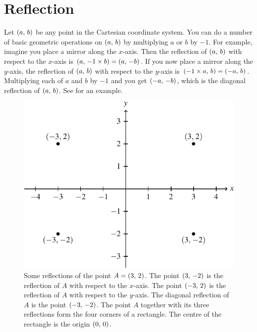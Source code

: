 \documentclass[a4paper,oneside,12pt]{article}
\begin{document}

\section{Reflection}

Let $\left\lparen{a},\, {b}\right\rparen$ be any point in the Cartesian coordinate system.
You can do a number of basic geometric operations on $\left\lparen{a},\, {b}\right\rparen$ by
multiplying $a$ or $b$ by $-1$.  For example, imagine you place a
mirror along the $x$-axis.  Then the reflection of $\left\lparen{a},\, {b}\right\rparen$ with
respect to the $x$-axis is $\left\lparen{a},\, {-1 \times b}\right\rparen = \left\lparen{a},\, {-b}\right\rparen$.
If you now place a mirror along the $y$-axis, the reflection of
$\left\lparen{a},\, {b}\right\rparen$ with respect to the $y$-axis is
$\left\lparen{-1 \times a},\, {b}\right\rparen = \left\lparen{-a},\, {b}\right\rparen$.  Multiplying each of $a$ and
$b$ by $-1$ and you get $\left\lparen{-a},\, {-b}\right\rparen$, which is the diagonal
reflection of $\left\lparen{a},\, {b}\right\rparen$.  See 
for an example.

\begin{figure}[!htbp]
\centering
\includegraphics[scale=1.1]{image/03/reflection.pdf}
\caption{%
  Some reflections of the point $A = \left\lparen{3},\, {2}\right\rparen$.  The point
  $\left\lparen{3},\, {-2}\right\rparen$ is the reflection of $A$ with respect to the
  $x$-axis.  The point $\left\lparen{-3},\, {2}\right\rparen$ is the reflection of $A$ with
  respect to the $y$-axis.  The diagonal reflection of $A$ is the
  point $\left\lparen{-3},\, {-2}\right\rparen$.  The point $A$ together with its three
  reflections form the four corners of a rectangle.  The centre of the
  rectangle is the origin $\left\lparen{0},\, {0}\right\rparen$.
}
\label{fig:reflections_of_point}
\end{figure}
\end{document}

